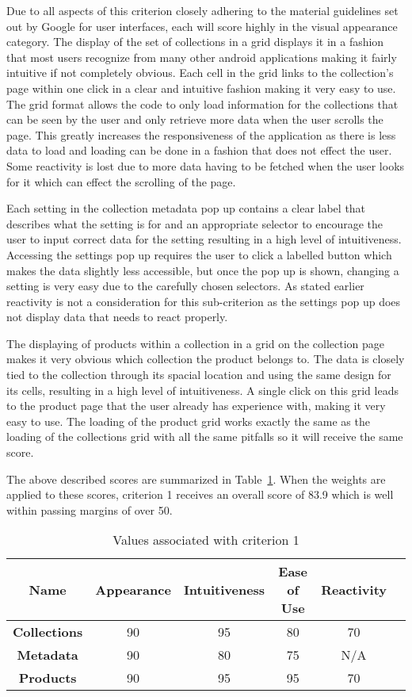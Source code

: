 \documentclass[12pt]{article}
\begin{document}
Due to all aspects of this criterion closely adhering to the material guidelines set out by Google for user interfaces, each will score highly in the visual appearance category. The display of the set of collections in a grid displays it in a fashion that most users recognize from many other android applications making it fairly intuitive if not completely obvious. Each cell in the grid links to the collection's page within one click in a clear and intuitive fashion making it very easy to use. The grid format allows the code to only load information for the collections that can be seen by the user and only retrieve more data when the user scrolls the page. This greatly increases the responsiveness of the application as there is less data to load and loading can be done in a fashion that does not effect the user. Some reactivity is lost due to more data having to be fetched when the user looks for it which can effect the scrolling of the page.

Each setting in the collection metadata pop up contains a clear label that describes what the setting is for and an appropriate selector to encourage the user to input correct data for the setting resulting in a high level of intuitiveness. Accessing the settings pop up requires the user to click a labelled button which makes the data slightly less accessible, but once the pop up is shown, changing a setting is very easy due to the carefully chosen selectors. As stated earlier reactivity is not a consideration for this sub-criterion as the settings pop up does not display data that needs to react properly.

The displaying of products within a collection in a grid on the collection page makes it very obvious which collection the product belongs to. The data is closely tied to the collection through its spacial location and using the same design for its cells, resulting in a high level of intuitiveness. A single click on this grid leads to the product page that the user already has experience with, making it very easy to use. The loading of the product grid works exactly the same as the loading of the collections grid with all the same pitfalls so it will receive the same score.

The above described scores are summarized in Table~\ref{table:4}. When the weights are applied to these scores, criterion 1 receives an overall score of 83.9 which is well within passing margins of over 50.

\begin{table}[h!]
\centering
	\begin{tabular}{|c|c|c|c|c|c|} 
		\hline
		\textbf{Name} & \textbf{Appearance} & \textbf{Intuitiveness} & \textbf{Ease of Use} & \textbf{Reactivity}\\
		\hline
		\textbf{Collections} 			& 90 & 95 & 80 & 70 \\
		\hline
		\textbf{Metadata} 				& 90 & 80 & 75 & N/A \\
		\hline
		\textbf{Products} 				& 90 & 95 & 95 & 70 \\
		\hline
	\end{tabular}
\caption{Values associated with criterion 1}
\label{table:4}
\end{table}
\end{document}
